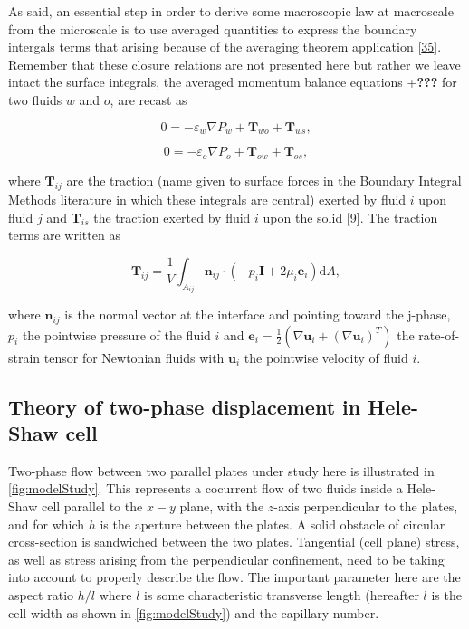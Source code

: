 \documentclass[]{article}
\begin{document}
As said, an essential step in order to derive some macroscopic law at
macroscale from the microscale is to use averaged quantities to express
the boundary intergals terms that arising because of the averaging
theorem application {[}\protect\hyperlink{ref-Whitaker2013}{35}{]}.
Remember that these closure relations are not presented here but rather
we leave intact the surface integrals, the averaged momentum balance
equations +\textbf{???} for two fluids \(w\) and \(o\), are recast as

\[
0=-\varepsilon_{w}\nabla P_{w}+\mathbf{T}_{wo}+\mathbf{T}_{ws}, 
\]

\[
0=-\varepsilon_{o}\nabla P_{o}+\mathbf{T}_{ow}+\mathbf{T}_{os},
\]

where \(\mathbf{T}_{ij}\) are the traction (name given to surface forces
in the Boundary Integral Methods literature in which these integrals are
central) exerted by fluid \(i\) upon fluid \(j\) and \(\mathbf{T}_{is}\)
the traction exerted by fluid \(i\) upon the solid
{[}\protect\hyperlink{ref-Kalaydjian1987}{9}{]}. The traction terms are
written as

\[
\mathbf{T}_{ij}=\frac{1}{V}\int_{A_{ij}}\mathbf{n}_{ij}\cdot\left(-p_{i}\mathbf{I}+2\mu_{i}\mathbf{e}_{i}\right)\mathrm{d}A,
\]

where \(\mathbf{n}_{ij}\) is the normal vector at the interface and
pointing toward the j-phase, \(p_{i}\) the pointwise pressure of the
fluid \(i\) and
\(\mathbf{e}_{i}=\frac{1}{2}\left(\nabla\mathbf{u}_{i}+\left(\nabla\mathbf{u}_{i}\right)^{T}\right)\)
the rate-of-strain tensor for Newtonian fluids with \(\mathbf{u}_{i}\)
the pointwise velocity of fluid \(i\).

\hypertarget{theory-of-two-phase-displacement-in-hele-shaw-cell}{%
\subsection{Theory of two-phase displacement in Hele-Shaw
cell}\label{theory-of-two-phase-displacement-in-hele-shaw-cell}}

Two-phase flow between two parallel plates under study here is
illustrated in \cref{fig:modelStudy}. This represents a cocurrent flow
of two fluids inside a Hele-Shaw cell parallel to the \(x-y\) plane,
with the \(z\)-axis perpendicular to the plates, and for which \(h\) is
the aperture between the plates. A solid obstacle of circular
cross-section is sandwiched between the two plates. Tangential (cell
plane) stress, as well as stress arising from the perpendicular
confinement, need to be taking into account to properly describe the
flow. The important parameter here are the aspect ratio \(h/l\) where
\(l\) is some characteristic transverse length (hereafter \(l\) is the
cell width as shown in \cref{fig:modelStudy}) and the capillary number.
\end{document}
